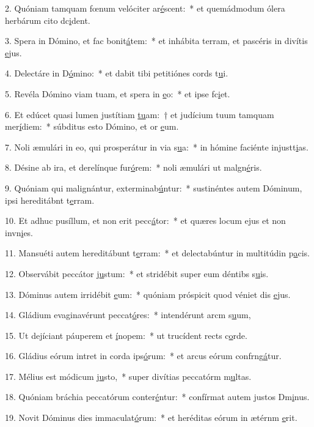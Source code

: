2. Quóniam tamquam fœnum velóciter ar\uline{é}scent:~* et quemádmodum ólera herbárum cito dc\uline{i}dent.\par 
3. Spera in Dómino, et fac bonit\uline{á}tem:~* et inhábita terram, et pascéris in divítis \uline{e}jus.\par 
4. Delectáre in D\uline{ó}mino:~* et dabit tibi petitiónes cords t\uline{u}i.\par 
5. Revéla Dómino viam tuam, et spera in \uline{e}o:~* et ipse fc\uline{i}et.\par 
6. Et edúcet quasi lumen justítiam \uline{tu}am:~† et judícium tuum tamquam mer\uline{í}diem:~* súbditus esto Dómino, et or \uline{e}um.\par 
7. Noli æmulári in eo, qui prosperátur in via s\uline{u}a:~* in hómine faciénte injustt\uline{i}as.\par 
8. Désine ab ira, et derelínque fur\uline{ó}rem:~* noli æmulári ut malgn\uline{é}ris.\par 
9. Quóniam qui malignántur, exterminab\uline{ú}ntur:~* sustinéntes autem Dóminum, ipsi hereditábnt t\uline{e}rram.\par 
10. Et adhuc pusíllum, et non erit pecc\uline{á}tor:~* et quæres locum ejus et non invn\uline{i}es.\par 
11. Mansuéti autem hereditábunt t\uline{e}rram:~* et delectabúntur in multitúdin p\uline{a}cis.\par 
12. Observábit peccátor j\uline{u}stum:~* et stridébit super eum déntibs s\uline{u}is.\par 
13. Dóminus autem irridébit \uline{e}um:~* quóniam próspicit quod véniet dis \uline{e}jus.\par 
14. Gládium evaginavérunt peccat\uline{ó}res:~* intendérunt arcm s\uline{u}um,\par 
15. Ut dejíciant páuperem et \uline{í}nopem:~* ut trucídent rects c\uline{o}rde.\par 
16. Gládius eórum intret in corda ips\uline{ó}rum:~* et arcus eórum confrng\uline{á}tur.\par 
17. Mélius est módicum j\uline{u}sto,~* super divítias peccatórm m\uline{u}ltas.\par 
18. Quóniam bráchia peccatórum conter\uline{é}ntur:~* confírmat autem justos Dm\uline{i}nus.\par 
19. Novit Dóminus dies immaculat\uline{ó}rum:~* et heréditas eórum in ætérnm \uline{e}rit.\par 
